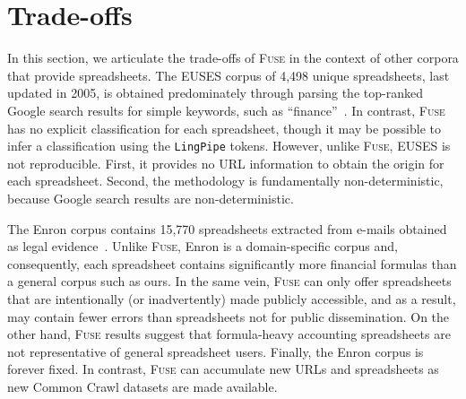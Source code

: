 \documentclass{svjour3}
\begin{document}




\section{Trade-offs}
\label{sec:trade-offs}

\balance

In this section, we articulate the trade-offs of \textsc{Fuse} in the context of other corpora that provide spreadsheets. The EUSES corpus of 4,498 unique spreadsheets, last updated in 2005, is obtained predominately through parsing the top-ranked Google search results for simple keywords, such as ``finance''~\cite{Fisher2005}. In contrast, \textsc{Fuse} has no explicit classification for each spreadsheet, though it may be possible to infer a classification using the \texttt{LingPipe} tokens. However, unlike \textsc{Fuse}, EUSES is not reproducible. First, it provides no URL information to obtain the origin for each spreadsheet. Second, the methodology is fundamentally non-deterministic, because Google search results are non-deterministic.

The Enron corpus contains 15,770 spreadsheets extracted from e-mails obtained as legal evidence~\cite{Hermans2015}. Unlike \textsc{Fuse}, Enron is a domain-specific corpus and, consequently, each spreadsheet contains significantly more financial formulas than a general corpus such as ours. In the same vein, \textsc{Fuse} can only offer spreadsheets that are intentionally (or inadvertently) made publicly accessible, and as a result, may contain fewer errors than spreadsheets not for public dissemination. On the other hand, \textsc{Fuse} results suggest that formula-heavy accounting spreadsheets are not representative of general spreadsheet users. Finally, the Enron corpus is forever fixed. In contrast, \textsc{Fuse} can accumulate new URLs and spreadsheets as new Common Crawl datasets are made available.
\end{document}
